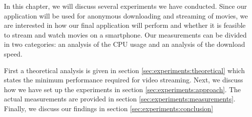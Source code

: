 In this chapter, we will discuss several experiments we have conducted. Since our application will be used for anonymous downloading and streaming of movies, we are interested in how our final application will perform and whether it is feasible to stream and watch movies on a smartphone. Our measurements can be divided in two categories: an analysis of the CPU usage and an analysis of the download speed.

First a theoretical analysis is given in section \ref{sec:experiments:theoretical} which states the minimum performance required for video streaming. Next, we discuss how we have set up the experiments in section \ref{sec:experiments:approach}. The actual measurements are provided in section \ref{sec:experiments:measurements}. Finally, we discuss our findings in section \ref{sec:experiments:conclusion}